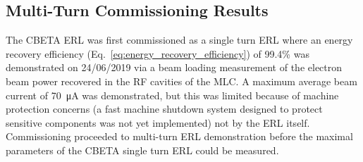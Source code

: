 \documentclass[../main.tex]{subfiles}
\begin{document}
\subsection{Multi-Turn Commissioning Results}

The CBETA ERL was first commissioned as a single turn ERL where an energy recovery efficiency (Eq.~\ref{eq:energy_recovery_efficiency}) of 99.4\% was demonstrated \cite{gulliford2021measurement} on 24/06/2019 via a beam loading measurement of the electron beam power recovered in the RF cavities of the MLC. A maximum average beam current of 70~\si{\micro\ampere} was demonstrated, but this was limited because of machine protection concerns (a fast machine shutdown system designed to protect sensitive components was not yet implemented) not by the ERL itself. Commissioning proceeded to multi-turn ERL demonstration before the maximal parameters of the CBETA single turn ERL could be measured.
\end{document}
